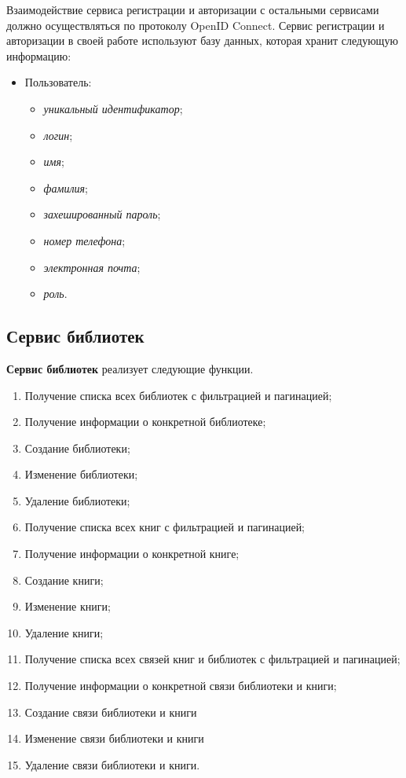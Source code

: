 Взаимодействие сервиса регистрации и авторизации с остальными сервисами должно осуществляться по протоколу OpenID Connect. Сервис регистрации и авторизации в своей работе используют базу данных, которая хранит следующую информацию:
\begin{itemize}
    \item Пользователь:
    \begin{itemize}
        \item \textit{уникальный идентификатор};
        \item \textit{логин};
        \item \textit{имя};
        \item \textit{фамилия};
        \item \textit{захешированный пароль};
        \item \textit{номер телефона};
        \item \textit{электронная почта};
        \item \textit{роль}.
    \end{itemize}
\end{itemize}


\subsection{Сервис библиотек} \label{section:library}

\textbf{Сервис библиотек} реализует следующие функции.
\begin{enumerate}
	\item Получение списка всех библиотек с фильтрацией и пагинацией;
	\item Получение информации о конкретной библиотеке;
	\item Создание библиотеки;
	\item Изменение библиотеки;
	\item Удаление библиотеки;
  \item Получение списка всех книг с фильтрацией и пагинацией;
	\item Получение информации о конкретной книге;
	\item Создание книги;
	\item Изменение книги;
	\item Удаление книги;
  \item Получение списка всех связей книг и библиотек с фильтрацией и пагинацией;
	\item Получение информации о конкретной связи библиотеки и книги;
	\item Создание связи библиотеки и книги
	\item Изменение связи библиотеки и книги
	\item Удаление связи библиотеки и книги.
\end{enumerate}

